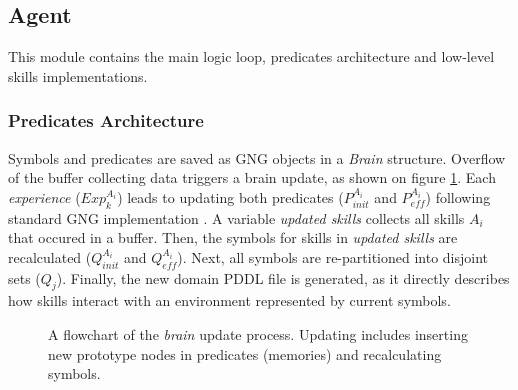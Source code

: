 \subsection{Agent}
This module contains the main logic loop, predicates architecture and low-level skills implementations.

\subsubsection*{Predicates Architecture}
Symbols and predicates are saved as GNG objects in a \textit{Brain} structure. Overflow of the buffer collecting data triggers a brain update, as shown on figure \ref{fig:brainupdate}. Each \textit{experience} ($Exp^{A_i}_k$) leads to updating both predicates ($P^{A_i}_{init}$ and $P^{A_i}_{eff}$) following standard GNG implementation \parencite{fritzke1994gng}. A variable \textit{updated skills} collects all skills $A_i$ that occured in a buffer. Then, the symbols for skills in \textit{updated skills} are recalculated ($Q^{A_i}_{init}$ and $Q^{A_i}_{eff}$). Next, all symbols are re-partitioned into disjoint sets ($Q_j$). Finally, the new domain PDDL file is generated, as it directly describes how skills interact with an environment represented by current symbols.

\begin{figure}[htbp]
    \centering
    {
        
    }
    \caption{A flowchart of the \textit{brain} update process. Updating includes inserting new prototype nodes in predicates (memories) and recalculating symbols.} 
    \label{fig:brainupdate}
\end{figure}


